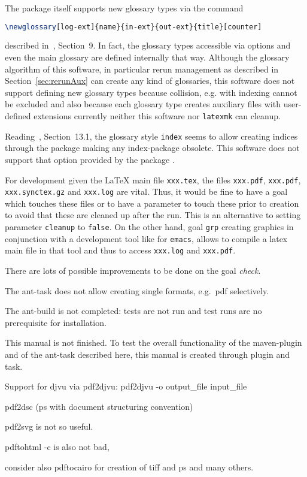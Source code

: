 The package  itself 
supports new glossary types via the command
%
\begin{lstlisting}[language=TeX, basicstyle=\small]
\newglossary[log-ext]{name}{in-ext}{out-ext}{title}[counter]
\end{lstlisting}
%
described in~\cite{GloP4_54}, Section~9. 
In fact, the glossary types accessible via options and even the main glossary 
are defined internally that way. 
Although the glossary algorithm of this software, 
in particular rerun management as described in Section~\ref{sec:rerunAux}
can create any kind of glossaries, 
this software does not support defining new glossary types 
because collision, e.g. with indexing cannot be excluded 
and also because each glossary type creates auxiliary files 
with user-defined extensions currently neither this software 
nor \texttt{latexmk} can cleanup. 

Reading~\cite{GloP4_54}, Section~13.1, the glossary style \texttt{index} 
seems to allow creating indices through the  package 
making any index-package obsolete. 
This software does not support that option provided by the package . 

For development given the \LaTeX{} main file \texttt{xxx.tex}, 
the files \texttt{xxx.pdf}, \texttt{xxx.pdf}, \texttt{xxx.synctex.gz} 
and \texttt{xxx.log} are vital. 
Thus, it would be fine to have a goal which touches these files 
or to have a parameter to touch these prior to creation 
to avoid that these are cleaned up after the run. 
This is an alternative to setting parameter \texttt{cleanup} to \texttt{false}. 
On the other hand, goal \texttt{grp} creating graphics 
in conjunction with a development tool like \auctex{} for \texttt{emacs}, 
allows to compile a latex main file in that tool 
and thus to access \texttt{xxx.log} and \texttt{xxx.pdf}. 

There are lots of possible improvements to be done on the goal \emph{check}. 


The ant-task does not allow creating single formats, e.g.~pdf selectively. 

The ant-build is not completed: tests are not run and 
test runs are no prerequisite for installation. 

This manual is not finished. 
To test the overall functionality of the maven-plugin and of the ant-task 
described here, this manual is created through plugin and task. 

Support for djvu via pdf2djvu: 
pdf2djvu -o output\_file input\_file

pdf2dsc
(ps with document structuring convention) 

pdf2svg is not so useful. 

pdftohtml -c is also not bad, 

consider also pdftocairo for creation of tiff and ps and many others. 
